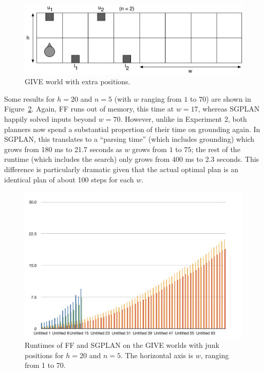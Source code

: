 \begin{figure}
  \centering
  \includegraphics[width=1\columnwidth]{pic-empty-buttons}
  \caption{GIVE world with extra positions.}
  \label{fig:give-junk}
\end{figure}

Some results for $h=20$ and $n=5$ (with $w$ ranging from $1$ to $70$)
are shown in Figure~\ref{fig:give-runtime-junk}.  Again, FF runs out of
memory, this time at $w=17$, whereas SGPLAN happily solved inputs
beyond $w=70$.  However, unlike in Experiment 2, both planners now
spend a substantial propertion of their time on grounding again.  In
SGPLAN, this translates to a ``parsing time'' (which
 includes grounding) which grows from 180 ms to 21.7
seconds as $w$ grows from $1$ to $75$; the rest of the runtime (which
includes the search) only grows from 400 ms to 2.3 seconds.  This
difference is particularly dramatic given that the actual optimal plan
is an identical plan of about 100 steps for each $w$.

\begin{figure}
  \centering
  \includegraphics[width=1\columnwidth]{pic-runtime-empty-world}
  \caption{Runtimes of FF and SGPLAN on the GIVE worlds with junk
    positions for $h=20$ and $n=5$. The horizontal axis is $w$,
    ranging from 1 to 70.}
  \label{fig:give-runtime-junk}
\end{figure}


